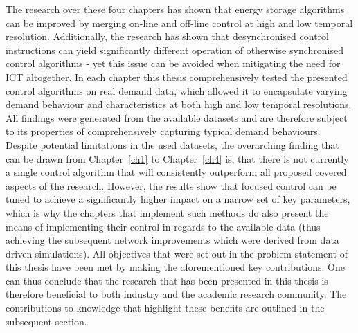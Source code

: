 The research over these four chapters has shown that energy storage algorithms can be improved by merging on-line and off-line control at high and low temporal resolution.
Additionally, the research has shown that desynchronised control instructions can yield significantly different operation of otherwise synchronised control algorithms - yet this issue can be avoided when mitigating the need for ICT altogether.
In each chapter this thesis comprehensively tested the presented control algorithms on real demand data, which allowed it to encapsulate varying demand behaviour and characteristics at both high and low temporal resolutions.
All findings were generated from the available datasets and are therefore subject to its properties of comprehensively capturing typical demand behaviours.
Despite potential limitations in the used datasets, the overarching finding that can be drawn from Chapter~\ref{ch1} to Chapter~\ref{ch4} is, that there is not currently a single control algorithm that will consistently outperform all proposed covered aspects of the research.
However, the results show that focused control can be tuned to achieve a significantly higher impact on a narrow set of key parameters, which is why the chapters that implement such methods do also present the means of implementing their control in regards to the available data (thus achieving the subsequent network improvements which were derived from data driven simulations).
All objectives that were set out in the problem statement of this thesis have been met by making the aforementioned key contributions.
One can thus conclude that the research that has been presented in this thesis is therefore beneficial to both industry and the academic research community.
The contributions to knowledge that highlight these benefits are outlined in the subsequent section.
